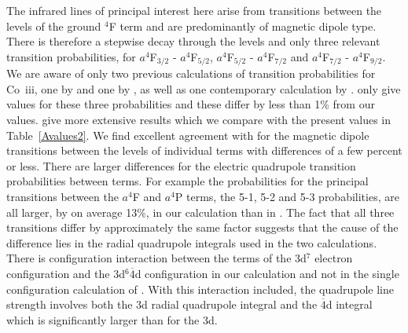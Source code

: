 \documentclass[useAMS,usenatbib]{mn2e}
\newcommand{\SL}  [2] {$^{#1}$#2}                  %
\newcommand{\III}     {~{\sc iii}}
\newcommand{\ps} [1]{\overline{#1}}
\begin{document}
The infrared lines of principal interest here arise from transitions between the levels of the
ground \SL4F term and are predominantly of magnetic dipole type. There is therefore a stepwise
decay through the levels and only three relevant transition probabilities, for $a^4$F$_{3/2}$ -
$a^4$F$_{5/2}$, $a^4$F$_{5/2}$ - $a^4$F$_{7/2}$ and $a^4$F$_{7/2}$ - $a^4$F$_{9/2}$. We are aware
of only two previous calculations of transition probabilities for Co\III, one by
\citet{HansenRU1984} and one by \citet{NussbaumerS1988}, as well as one contemporary calculation by
\citet{FivetQB2016}. \citet{NussbaumerS1988} only give values for these three probabilities and
these differ by less than 1\% from our values. \citet{HansenRU1984} give more extensive results
which we compare with the present values in Table~\ref{Avalues2}. We find excellent agreement with
\citet{HansenRU1984} for the magnetic dipole transitions between the levels of individual terms
with differences of a few percent or less. There are larger differences for the electric quadrupole
transition probabilities between terms. For example the probabilities for the principal transitions
between the $a^4$F and $a^4$P terms, the 5-1, 5-2 and 5-3 probabilities, are all larger, by on
average 13\%, in our calculation than in \citet{HansenRU1984}. The fact that all three transitions
differ by approximately the same factor suggests that the cause of the difference lies in the
radial quadrupole integrals used in the two calculations.  There is configuration interaction
between the terms of the 3d$^7$ electron configuration and the 3d$^6\ps4$d configuration in our
calculation and not in the single configuration calculation of \citet{HansenRU1984}. With this
interaction included, the quadrupole line strength involves both the 3d radial quadrupole integral
and the $\ps4$d integral which is significantly larger than for the 3d.
\end{document}
